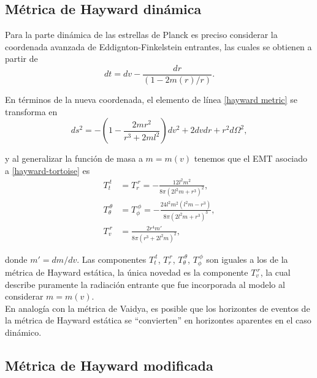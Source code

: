 \documentclass[16pt,a4paper]{article}
\numberwithin{equation}{section}
\theoremstyle{definition}
\begin{document}
\subsection{Métrica de Hayward dinámica}

Para la parte dinámica de las estrellas de Planck es preciso considerar la coordenada avanzada de Eddignton-Finkelstein entrantes, las cuales se obtienen a partir de
\begin{equation}
dt = dv - \frac{dr}{(1 - 2m(r)/r)}.
\end{equation}

En términos de la nueva coordenada, el elemento de línea \eqref{hayward metric} se transforma en 
\begin{equation}
\label{hayward-tortoise}
ds^2 = -\left( 1 - \frac{2mr^2}{r^3 + 2ml^2} \right) dv^2 + 2dvdr + r^2d\Omega ^2,
\end{equation}

y al generalizar la función de masa a $m = m(v)$ tenemos que el EMT asociado a \eqref{hayward-tortoise} es
\begin{equation}
\begin{aligned}
T_{t}^{\ t} &= T_{r}^{\ r} = -\frac{12 l^2 m^2}{8\pi\left(2 l^2 m+r^3\right)^2}, \\
T_{\theta}^{\ \theta} &= T_{\phi}^{\ \phi} = -\frac{24 l^2 m^2 \left(l^2 m-r^3\right)}{8\pi\left(2 l^2 m+r^3\right)^3},\\
T_{v}^{\ r} &= \frac{2r^4m'}{8\pi(r^3 + 2l^2m)^2},
\end{aligned}
\end{equation}

donde $m' = dm/dv$. Las componentes $T_{t}^{\ t}$, $T_{r}^{\ r}$, $T_{\theta}^{\ \theta}$, $T_{\phi}^{\ \phi}$ son iguales a los de la métrica de Hayward estática, la única novedad es la componente $T_{v}^{\ r}$, la cual describe puramente la radiación entrante que fue incorporada al modelo al considerar $m = m(v)$.\\

En analogía con la métrica de Vaidya, es posible que los horizontes de eventos de la métrica de Hayward estática se ``convierten'' en horizontes aparentes en el caso dinámico. 


\subsection{Métrica de Hayward modificada}
\end{document}
